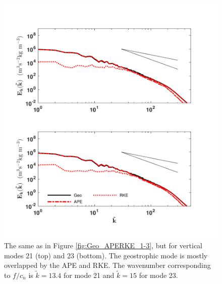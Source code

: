 \begin{figure}[H]
\includegraphics[scale=1]{Chapter4/img/Geo_APERKE_21-23}
\caption{The same as in Figure \ref{fig:Geo_APERKE_1-3}, but for vertical modes 21 (top) and 23 (bottom). The geostrophic mode is mostly overlapped by the APE and RKE. The wavenumber corresponding to $f/c_n$ is $\tilde{k} = 13.4$ for mode 21 and $\tilde{k} = 15$ for mode 23.}
\label{fig:Geo_APERKE_21-23}
\end{figure}

